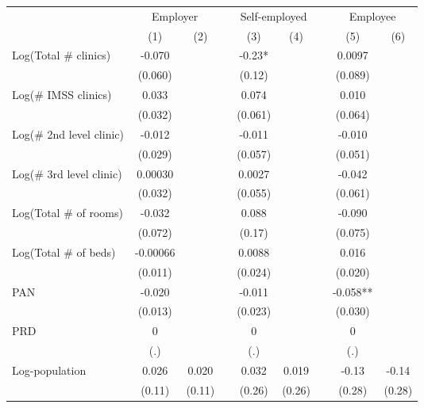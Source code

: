 \begin{tabular}{lcccccccc}
\toprule
      & \multicolumn{2}{c}{Employer} &       & \multicolumn{2}{c}{Self-employed} &       & \multicolumn{2}{c}{Employee} \\
\cmidrule{2-3}\cmidrule{5-6}\cmidrule{8-9}      & (1)   & (2)   &       & (3)   & (4)   &       & (5)   & (6) \\
\midrule
\midrule
Log(Total \# clinics) & -0.070 &       &       & -0.23* &       &       & 0.0097 &  \\
      & (0.060) &       &       & (0.12) &       &       & (0.089) &  \\
Log(\# IMSS clinics) & 0.033 &       &       & 0.074 &       &       & 0.010 &  \\
      & (0.032) &       &       & (0.061) &       &       & (0.064) &  \\
Log(\# 2nd level clinic) & -0.012 &       &       & -0.011 &       &       & -0.010 &  \\
      & (0.029) &       &       & (0.057) &       &       & (0.051) &  \\
Log(\# 3rd level clinic) & 0.00030 &       &       & 0.0027 &       &       & -0.042 &  \\
      & (0.032) &       &       & (0.055) &       &       & (0.061) &  \\
Log(Total \# of rooms) & -0.032 &       &       & 0.088 &       &       & -0.090 &  \\
      & (0.072) &       &       & (0.17) &       &       & (0.075) &  \\
Log(Total \# of beds) & -0.00066 &       &       & 0.0088 &       &       & 0.016 &  \\
      & (0.011) &       &       & (0.024) &       &       & (0.020) &  \\
PAN   & -0.020 &       &       & -0.011 &       &       & -0.058** &  \\
      & (0.013) &       &       & (0.023) &       &       & (0.030) &  \\
PRD   & 0     &       &       & 0     &       &       & 0     &  \\
      & (.)   &       &       & (.)   &       &       & (.)   &  \\
\midrule
Log-population & 0.026 & 0.020 &       & 0.032 & 0.019 &       & -0.13 & -0.14 \\
      & (0.11) & (0.11) &       & (0.26) & (0.26) &       & (0.28) & (0.28) \\

\end{tabular}
